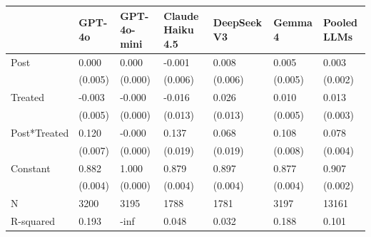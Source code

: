 \begin{tabular}{lllllll}
\toprule
 & GPT-4o & GPT-4o-mini & Claude Haiku 4.5 & DeepSeek V3 & Gemma 4 & Pooled LLMs \\
\midrule
Post & 0.000 & 0.000 & -0.001 & 0.008 & 0.005 & 0.003 \\
 & (0.005) & (0.000) & (0.006) & (0.006) & (0.005) & (0.002) \\
Treated & -0.003 & -0.000 & -0.016 & 0.026 & 0.010 & 0.013 \\
 & (0.005) & (0.000) & (0.013) & (0.013) & (0.005) & (0.003) \\
Post*Treated & 0.120 & -0.000 & 0.137 & 0.068 & 0.108 & 0.078 \\
 & (0.007) & (0.000) & (0.019) & (0.019) & (0.008) & (0.004) \\
Constant & 0.882 & 1.000 & 0.879 & 0.897 & 0.877 & 0.907 \\
 & (0.004) & (0.000) & (0.004) & (0.004) & (0.004) & (0.002) \\
N & 3200 & 3195 & 1788 & 1781 & 3197 & 13161 \\
R-squared & 0.193 & -inf & 0.048 & 0.032 & 0.188 & 0.101 \\
\bottomrule
\end{tabular}
